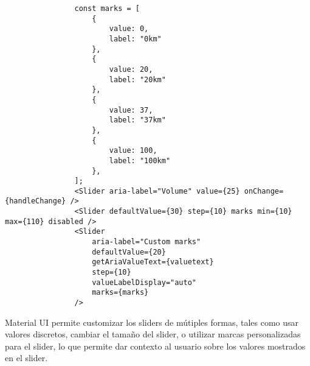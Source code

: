 \begin{itemize}
        \begin{lstlisting}
                const marks = [
                    {
                        value: 0,
                        label: "0km"
                    },
                    {
                        value: 20,
                        label: "20km"
                    },
                    {
                        value: 37,
                        label: "37km"
                    },
                    {
                        value: 100,
                        label: "100km"
                    },
                ];
                <Slider aria-label="Volume" value={25} onChange={handleChange} />
                <Slider defaultValue={30} step={10} marks min={10} max={110} disabled />
                <Slider
                    aria-label="Custom marks"
                    defaultValue={20}
                    getAriaValueText={valuetext}
                    step={10}
                    valueLabelDisplay="auto"
                    marks={marks}
                />
            \end{lstlisting}

        Material UI permite customizar los sliders de mútiples formas, tales como usar valores discretos, cambiar el tamaño del slider, o utilizar marcas personalizadas para el slider, lo que permite dar contexto al usuario sobre los valores mostrados en el slider.

\end{itemize}

